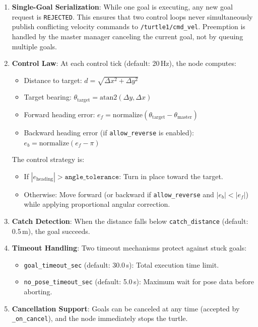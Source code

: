 \documentclass[12pt,a4paper]{article}
\begin{document}
\begin{enumerate}[label=\arabic*.]
  \item \textbf{Single-Goal Serialization}: While one goal is executing, any new goal request is \texttt{REJECTED}. This ensures that two control loops never simultaneously publish conflicting velocity commands to \texttt{/turtle1/cmd\_vel}. Preemption is handled by the master manager canceling the current goal, not by queuing multiple goals.

  \item \textbf{Control Law}: At each control tick (default: 20\,Hz), the node computes:
  \begin{itemize}
    \item Distance to target: $d = \sqrt{\Delta x^2 + \Delta y^2}$
    \item Target bearing: $\theta_{\text{target}} = \text{atan2}(\Delta y, \Delta x)$
    \item Forward heading error: $e_f = \text{normalize}(\theta_{\text{target}} - \theta_{\text{master}})$
    \item Backward heading error (if \texttt{allow\_reverse} is enabled): $e_b = \text{normalize}(e_f - \pi)$
  \end{itemize}

  The control strategy is:
  \begin{itemize}
    \item If $|e_{\text{heading}}| > \texttt{angle\_tolerance}$: Turn in place toward the target.
    \item Otherwise: Move forward (or backward if \texttt{allow\_reverse} and $|e_b| < |e_f|$) while applying proportional angular correction.
  \end{itemize}

  \item \textbf{Catch Detection}: When the distance falls below \texttt{catch\_distance} (default: 0.5\,m), the goal succeeds.

  \item \textbf{Timeout Handling}: Two timeout mechanisms protect against stuck goals:
  \begin{itemize}
    \item \texttt{goal\_timeout\_sec} (default: 30.0\,s): Total execution time limit.
    \item \texttt{no\_pose\_timeout\_sec} (default: 5.0\,s): Maximum wait for pose data before aborting.
  \end{itemize}

  \item \textbf{Cancellation Support}: Goals can be canceled at any time (accepted by \texttt{\_on\_cancel}), and the node immediately stops the turtle.
\end{enumerate}
\end{document}
